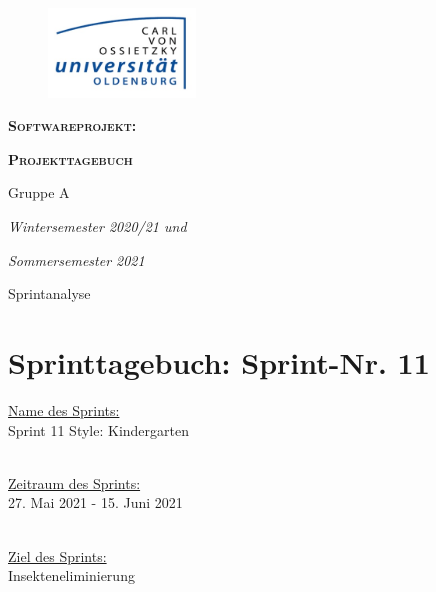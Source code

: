 \documentclass[12pt,a4paper, oneside]{article}
\author{Uni Oldenburg, SWP2020 Gruppe A}
\begin{document}
\begin{titlepage}
\pagestyle{empty}
\begin{center}

\begin{figure}[h]
\centering
\includegraphics[width=0.35\textwidth]{../img/Logo.jpg}
\end{figure}

\bigskip \bigskip \noindent
\textsc{\textbf{\LARGE Softwareprojekt:}} \par \bigskip \noindent
\textsc{\textbf{\LARGE Projekttagebuch}}

\par \bigskip \bigskip \bigskip \bigskip \bigskip \noindent
{\Large Gruppe A} \par \medskip \noindent

\par \bigskip \bigskip \bigskip \bigskip \bigskip \bigskip \noindent
\textit{\Large Wintersemester 2020/21 und} \par \noindent
\textit{\Large Sommersemester 2021}

\par \bigskip \bigskip \bigskip \bigskip \bigskip \bigskip \noindent
\par \bigskip \bigskip \bigskip \noindent
{\Large Sprintanalyse} \par \medskip \noindent

\end{center}
\end{titlepage}

\tableofcontents
\pagebreak

\section{Sprinttagebuch: Sprint-Nr. 11}

\underline{Name des Sprints:}
\\
Sprint 11 Style: Kindergarten

\noindent
\\
\underline{Zeitraum des Sprints:}
\\
27. Mai 2021 - 15. Juni 2021

\noindent
\\
\underline{Ziel des Sprints:}
\\
Insekteneliminierung
\end{document}
